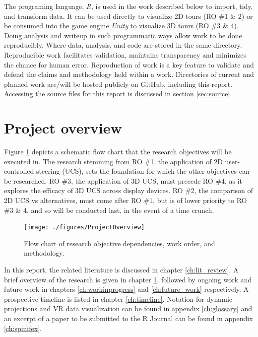 \documentclass{monashthesis}
\begin{document}
The programing language, \emph{R}, is used in the work described below to import, tidy, and transform data. It can be used directly to visualize 2D tours (RO \#1 \& 2) or be consumed into the game engine \emph{Unity} to visualize 3D tours (RO \#3 \& 4). Doing analysis and writeup in such programmatic ways allow work to be done reproducibly. Where data, analysis, and code are stored in the same directory. Reproducible work facilitates validation, maintains transparency and minimizes the chance for human error. Reproduction of work is a key feature to validate and defend the claims and methodology held within a work. Directories of current and planned work are/will be hosted publicly on GitHub, including this report. Accessing the source files for this report is discussed in section \ref{sec:source}.

\hypertarget{ch:projectoverview}{%
\section{Project overview}\label{ch:projectoverview}}

Figure \ref{fig:ProjectOverview} depicts a schematic flow chart that the research objectives will be executed in. The research stemming from RO \#1, the application of 2D user-controlled steering (UCS), sets the foundation for which the other objectives can be researched. RO \#3, the application of 3D UCS, must precede RO \#4, as it explores the efficacy of 3D UCS across display devices. RO \#2, the comparison of 2D UCS vs alternatives, must come after RO \#1, but is of lower priority to RO \#3 \& 4, and so will be conducted last, in the event of a time crunch.



\begin{figure}

{\centering \texttt{[image: ./figures/ProjectOverview]} 

}

\caption{Flow chart of research objective dependencies, work order, and methodology.}\label{fig:ProjectOverview}
\end{figure}

In this report, the related literature is discussed in chapter \ref{ch:lit_review}. A brief overview of the research is given in chapter \ref{ch:projectoverview}, followed by ongoing work and future work in chapters \ref{ch:workinprogress} and \ref{ch:future_work} respectively. A prospective timeline is listed in chapter \ref{ch:timeline}. Notation for dynamic projections and VR data visualization can be found in appendix \ref{ch:glossary} and an excerpt of a paper to be submitted to the R Journal can be found in appendix \ref{ch:spinifex}.
\end{document}
